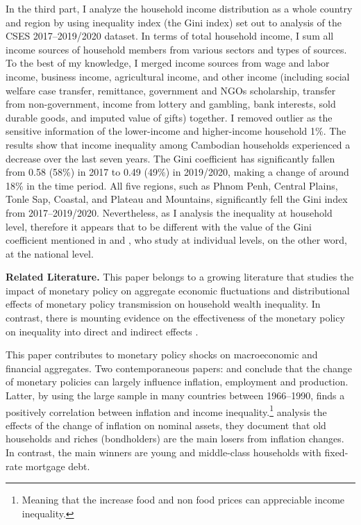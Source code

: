 \documentclass[11pt,letterpaper]{article}
\begin{document}
In the third part, I analyze the household income distribution as a whole country and region by using inequality index (the Gini index) set out to analysis of the CSES 2017--2019/2020 dataset. In terms of total household income, I sum all income sources of household members from various sectors and types of sources. To the best of my knowledge, I merged income sources from wage and labor income, business income, agricultural income, and other income (including social welfare case transfer, remittance, government and NGOs scholarship, transfer from non-government, income from lottery and gambling, bank interests, sold durable goods, and imputed value of gifts) together. I removed outlier as the sensitive information of the lower-income and higher-income household 1\%. The results show that income inequality among Cambodian households experienced a decrease over the last seven years. The Gini coefficient has significantly fallen from 0.58 (58\%) in 2017 to 0.49 (49\%) in 2019/2020, making a change of around 18\% in the time period. All five regions, such as Phnom Penh, Central Plains, Tonle Sap, Coastal, and Plateau and Mountains, significantly fell the Gini index from 2017--2019/2020. Nevertheless, as I analysis the inequality at household level, therefore it appears that to be different with the value of the Gini coefficient mentioned in \citet{Hansen2019} and \citet{Solt2020}, who study at individual levels, on the other word, at the national level. 

\vspace{1em}

\noindent \textbf{Related Literature.} This paper belongs to a growing literature that studies the impact of monetary policy on aggregate economic fluctuations and distributional effects of monetary policy transmission on household wealth inequality. In contrast, there is mounting evidence on the effectiveness of the monetary policy on inequality into direct and indirect effects \cite{Albanesi2001, Auclert2019, Coibion2017, Crawley2019, Furceri2016, Kaplan2018, Mumtaz2017, Romer2004, Samarina2019}. 

This paper contributes to monetary policy shocks on macroeconomic and financial aggregates. Two contemporaneous papers: \citet{Lucas1996} and \citet{Romer2004} conclude that the change of monetary policies can largely influence inflation, employment and production. Latter, by using the large sample in many countries between 1966--1990, \citet{Albanesi2001} finds a positively correlation between inflation and income inequality.\footnote{Meaning that the increase food and non food prices can appreciable income inequality.} \citet{Doepke2006} analysis the effects of the change of inflation on nominal assets, they document that old households and riches (bondholders) are the main losers from inflation changes. In contrast, the main winners are young and middle-class households with fixed-rate mortgage debt.
\end{document}

